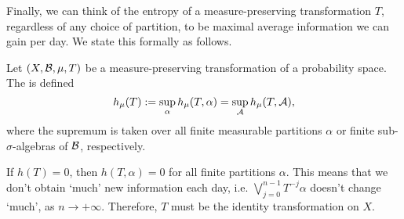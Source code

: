 Finally, we can think of the entropy of a measure-preserving transformation $T$, regardless of any choice of partition, to be maximal average information we can gain per day. We state this formally as follows.

\begin{definition}
	Let $(X, \mathcal{B}, \mu, T)$ be a measure-preserving transformation of a probability space. The  is defined
	\[
		h_\mu(T) := \sup_{\alpha}{h_\mu(T, \alpha)} = \sup_{\mathcal{A}}{h_\mu(T, \mathcal{A})},
	\]
	where the supremum is taken over all finite measurable partitions $\alpha$ or finite sub-$\sigma$-algebras of $\mathcal{B}$, respectively.
\end{definition}

\begin{remark}
	If $h(T) = 0$, then $h(T, \alpha) = 0$ for all finite partitions $\alpha$. This means that we don't obtain `much' new information each day, i.e. $\bigvee_{j = 0}^{n - 1}{T^{-j}{\alpha}}$ doesn't change `much', as $n \to +\infty$. Therefore, $T$ must be the identity transformation on $X$.
\end{remark}

